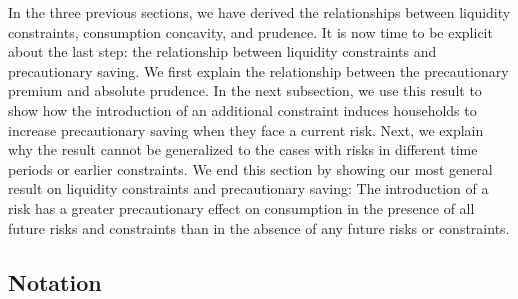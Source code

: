 \documentclass[titlepage]{\econtex}
\begin{document}
  In the three previous sections, we have derived the relationships between liquidity constraints, consumption concavity, and prudence. It is now time to be explicit about the last step: the relationship between liquidity constraints and precautionary saving. We first explain the relationship between the precautionary premium and absolute prudence. In the next subsection, we use this result to show how the introduction of an additional constraint induces households to increase precautionary saving when they face a current risk. Next, we explain why the result cannot be generalized to the cases with risks in different time periods or earlier constraints. We end this section by showing our most general result on liquidity constraints and precautionary saving: The introduction of a risk has a greater precautionary effect on consumption in the presence of all future risks and constraints than in the absence of any future risks or constraints.

\subsection{Notation}\label{subsec:PrudAndCPP}
\end{document}
